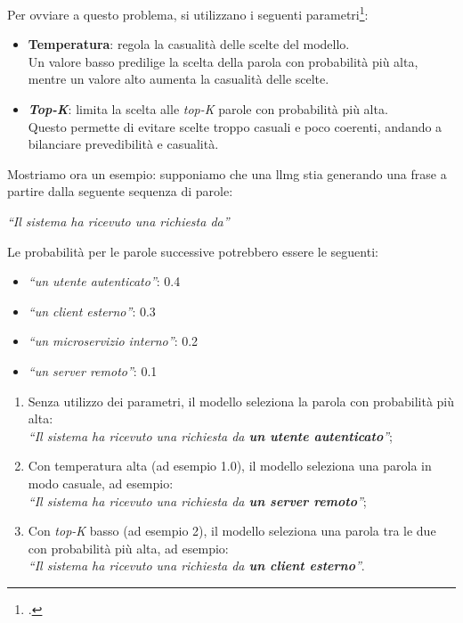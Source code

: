 \noindent Per ovviare a questo problema, si utilizzano i seguenti parametri\footcite{site:mediun-llm-parameters}:
\begin{itemize}
    \item \textbf{Temperatura}: regola la casualità delle scelte del modello. \\
    Un valore basso predilige la scelta della parola con probabilità più alta, mentre un valore alto aumenta la casualità delle scelte.
    \item \textbf{\textit{Top-K}}: limita la scelta alle \textit{top-K} parole con probabilità più alta.\\
    Questo permette di evitare scelte troppo casuali e poco coerenti, andando a bilanciare prevedibilità e casualità.\\
\end{itemize}

\noindent Mostriamo ora un esempio: supponiamo che una \gls{llmg} stia generando una frase a partire dalla seguente sequenza di parole: 
\begin{center}
    \textit{``Il sistema ha ricevuto una richiesta da''}\\
\end{center}

Le probabilità per le parole successive potrebbero essere le seguenti:
\begin{itemize}
    \item \textit{``un utente autenticato''}: 0.4
    \item \textit{``un client esterno''}: 0.3
    \item \textit{``un microservizio interno''}: 0.2
    \item \textit{``un server remoto''}: 0.1
\end{itemize}
\pagebreak
\begin{enumerate}
    \item Senza utilizzo dei parametri, il modello seleziona la parola con probabilità più alta: \\
    \textit{``Il sistema ha ricevuto una richiesta da \textbf{un utente autenticato}''};
    \item Con temperatura alta (ad esempio 1.0), il modello seleziona una parola in modo casuale, ad esempio: \\
    \textit{``Il sistema ha ricevuto una richiesta da \textbf{un server remoto}''};
    \item Con \textit{top-K} basso (ad esempio 2), il modello seleziona una parola tra le due con probabilità più alta, ad esempio: \\
    \textit{``Il sistema ha ricevuto una richiesta da \textbf{un client esterno}''}.
\end{enumerate}

